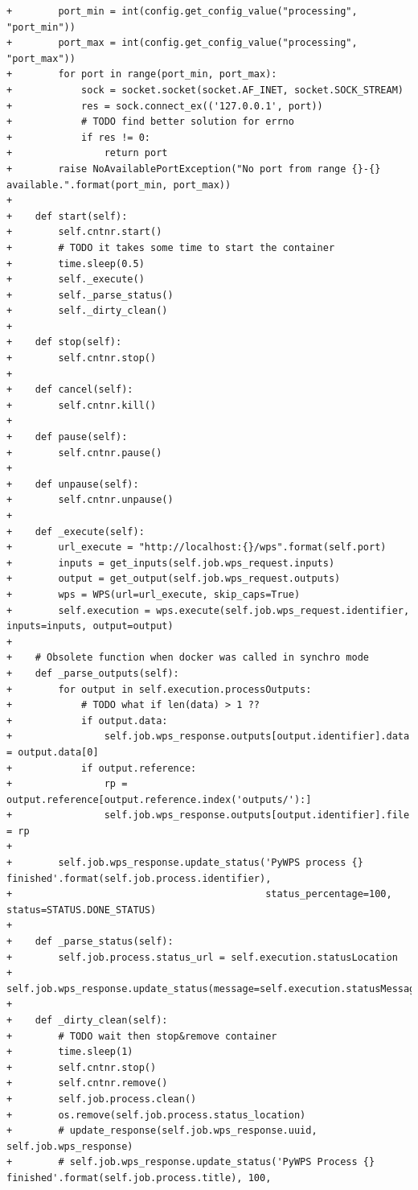 \documentclass[12pt,a4paper]{article}
\begin{document}
\begin{lstlisting}[basicstyle=\small,caption={pywps diff file}]
+        port_min = int(config.get_config_value("processing", "port_min"))
+        port_max = int(config.get_config_value("processing", "port_max"))
+        for port in range(port_min, port_max):
+            sock = socket.socket(socket.AF_INET, socket.SOCK_STREAM)
+            res = sock.connect_ex(('127.0.0.1', port))
+            # TODO find better solution for errno
+            if res != 0:
+                return port
+        raise NoAvailablePortException("No port from range {}-{} available.".format(port_min, port_max))
+
+    def start(self):
+        self.cntnr.start()
+        # TODO it takes some time to start the container
+        time.sleep(0.5)
+        self._execute()
+        self._parse_status()
+        self._dirty_clean()
+
+    def stop(self):
+        self.cntnr.stop()
+
+    def cancel(self):
+        self.cntnr.kill()
+
+    def pause(self):
+        self.cntnr.pause()
+
+    def unpause(self):
+        self.cntnr.unpause()
+
+    def _execute(self):
+        url_execute = "http://localhost:{}/wps".format(self.port)
+        inputs = get_inputs(self.job.wps_request.inputs)
+        output = get_output(self.job.wps_request.outputs)
+        wps = WPS(url=url_execute, skip_caps=True)
+        self.execution = wps.execute(self.job.wps_request.identifier, inputs=inputs, output=output)
+
+    # Obsolete function when docker was called in synchro mode
+    def _parse_outputs(self):
+        for output in self.execution.processOutputs:
+            # TODO what if len(data) > 1 ??
+            if output.data:
+                self.job.wps_response.outputs[output.identifier].data = output.data[0]
+            if output.reference:
+                rp = output.reference[output.reference.index('outputs/'):]
+                self.job.wps_response.outputs[output.identifier].file = rp
+
+        self.job.wps_response.update_status('PyWPS process {} finished'.format(self.job.process.identifier),
+                                            status_percentage=100, status=STATUS.DONE_STATUS)
+
+    def _parse_status(self):
+        self.job.process.status_url = self.execution.statusLocation
+        self.job.wps_response.update_status(message=self.execution.statusMessage)
+
+    def _dirty_clean(self):
+        # TODO wait then stop&remove container
+        time.sleep(1)
+        self.cntnr.stop()
+        self.cntnr.remove()
+        self.job.process.clean()
+        os.remove(self.job.process.status_location)
+        # update_response(self.job.wps_response.uuid, self.job.wps_response)
+        # self.job.wps_response.update_status('PyWPS Process {} finished'.format(self.job.process.title), 100,

\end{lstlisting}
\end{document}
